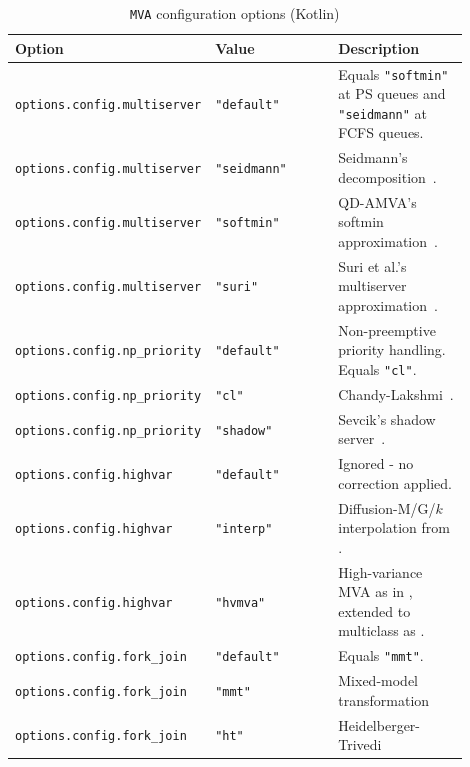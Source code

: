 \begin{KOTLIN}
{
\begin{table}[thbp]
\footnotesize
\centering
\caption{\texttt{MVA} configuration options (Kotlin)}
\begin{tabular}{|p{0.3\linewidth}|p{0.3\linewidth}|p{0.3\linewidth}|}
\hline
\textbf{Option} & \textbf{Value} & \textbf{Description}\\
\hline
\texttt{options.config.multiserver} & \texttt{"default"} & Equals \texttt{"softmin"} at PS queues and \texttt{"seidmann"} at FCFS queues.\\
\texttt{options.config.multiserver} & \texttt{"seidmann"} & Seidmann's decomposition~\cite{seidmann1987computerized}.\\
\texttt{options.config.multiserver} & \texttt{"softmin"} & QD-AMVA's softmin approximation~\cite{casale2015qdamva}.\\
\texttt{options.config.multiserver} & \texttt{"suri"} & Suri et al.'s multiserver approximation~\cite{suri2007approximate}.\\
\hline
\texttt{options.config.np\_priority} & \texttt{"default"} & Non-preemptive priority handling. Equals \texttt{"cl"}.\\
\texttt{options.config.np\_priority} & \texttt{"cl"} & Chandy-Lakshmi~\cite{EagL88}.\\
\texttt{options.config.np\_priority} & \texttt{"shadow"} & Sevcik's shadow server~\cite{Sev77}.\\
\hline
\texttt{options.config.highvar} & \texttt{"default"} & Ignored - no correction applied.\\
\texttt{options.config.highvar} & \texttt{"interp"} & Diffusion-M/G/$k$ interpolation from \cite{Casale2020a}.\\
\texttt{options.config.highvar} & \texttt{"hvmva"} & High-variance MVA as in \cite{BonW86}, extended to multiclass as \cite[Eq. 3.21]{Franks1996}.\\
\hline
\texttt{options.config.fork\_join} & \texttt{"default"} & Equals \texttt{"mmt"}. \\
\texttt{options.config.fork\_join} & \texttt{"mmt"} & Mixed-model transformation \cite{dobre24}\\
\texttt{options.config.fork\_join} & \texttt{"ht"} & Heidelberger-Trivedi~\cite{heidelberger1982queueing}\\
\hline
\end{tabular}
\label{TAB_MVA_config_KOTLIN}
\end{table}
}
\end{KOTLIN}
